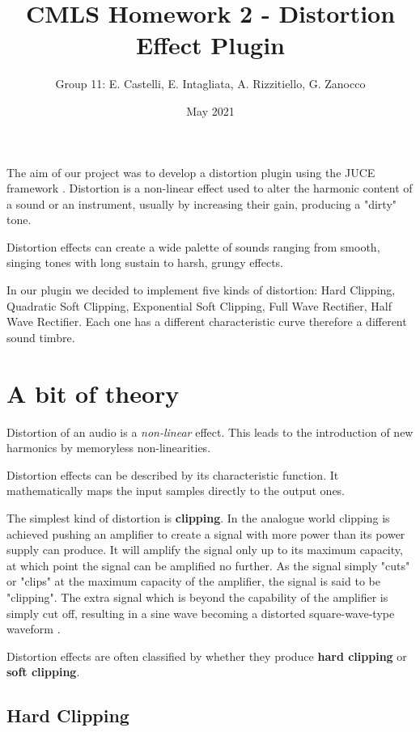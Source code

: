 \documentclass[letterpaper, 12pt]{article}
\begin{document}
	
	\title{CMLS Homework 2 - Distortion Effect Plugin}
	\author{Group 11: E. Castelli, E. Intagliata, A. Rizzitiello, G. Zanocco}
	\date{May 2021}
	\maketitle
	
	
	The aim of our project was to develop a distortion plugin using the JUCE framework \cite{juce}.
	Distortion is a non-linear effect used to alter the harmonic content of a sound or an instrument, usually by increasing their gain, producing a "dirty" tone.
	
	Distortion effects can create a wide palette of sounds ranging from smooth, singing
	tones with long sustain to harsh, grungy effects.
	
	In our plugin we decided to implement five kinds of distortion: Hard Clipping, Quadratic Soft Clipping, Exponential Soft Clipping, Full Wave Rectifier, Half Wave Rectifier.
	Each one has a different characteristic curve therefore a different sound timbre.
	
	\section{A bit of theory}
	Distortion of an audio is a \textit{non-linear} effect. This leads to the introduction of new harmonics by memoryless non-linearities.
	
	Distortion effects can be described by its characteristic function. It mathematically maps the input samples directly to the output ones.
	
	The simplest kind of distortion is \textbf{clipping}.
	In the analogue world clipping is achieved pushing an amplifier to create a signal with more power than its power supply can produce. It will amplify the signal only up to its maximum capacity, at which point the signal can be amplified no further. 
	As the signal simply "cuts" or "clips" at the maximum capacity of the amplifier, the signal is said to be "clipping". The extra signal which is beyond the capability of the amplifier is simply cut off, resulting in a sine wave becoming a distorted square-wave-type waveform \cite{clipping}. 
	
	Distortion effects are often classified by whether they produce \textbf{hard clipping} or \textbf{soft clipping}. 
	
	\subsection*{Hard Clipping}
	
\end{document}
